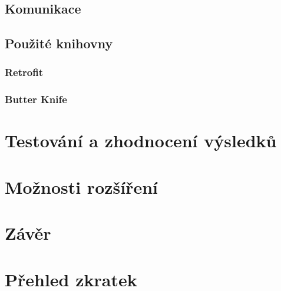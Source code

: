 \documentclass[czech,BP]{thesiskiv}
\begin{document}
	\section{Komunikace}

	
		

	\section{Použité knihovny}
		\subsection{Retrofit}
		\subsection{Butter Knife}

\chapter{Testování a zhodnocení výsledků}	




\chapter{Možnosti rozšíření}


\chapter{Závěr}






\chapter*{Přehled zkratek}
\end{document}
